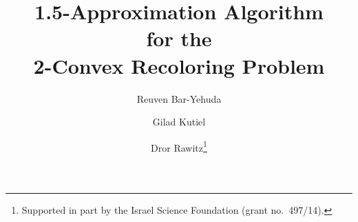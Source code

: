 \title{
1.5-Approximation Algorithm 	\\
for the							\\ 
2-Convex Recoloring Problem
}

% 
% 
% 

\author{
	Reuven Bar-Yehuda \and
	Gilad Kutiel \and
	Dror Rawitz\thanks{Supported in part by the Israel Science Foundation (grant no.~497/14).}
}



